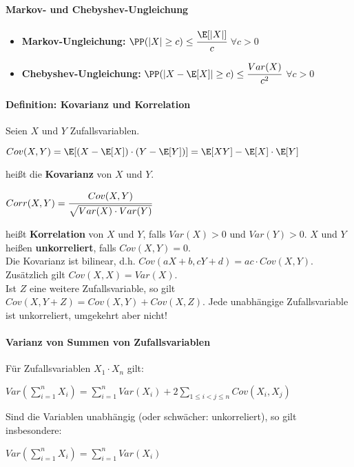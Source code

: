 \paragraph{Markov- und Chebyshev-Ungleichung}
\begin{itemize}
	\item \textbf{Markov-Ungleichung:} $\PP(|X|\geq c)\leq\cfrac{\E[|X|]}{c}$ \qquad$\forall c>0$
	\item \textbf{Chebyshev-Ungleichung:} $\PP(|X-\E[X]|\geq c)\leq\cfrac{Var(X)}{c^2}$ \qquad$\forall c>0$
\end{itemize}

\paragraph{Definition: Kovarianz und Korrelation}
Seien $X$ und $Y$ Zufallsvariablen.
\begin{tightcenter}
	$Cov(X,Y)=\E[(X-\E[X])\cdot(Y-\E[Y])]=\E[XY]-\E[X]\cdot\E[Y]$
\end{tightcenter}
heißt die \textbf{Kovarianz} von $X$ und $Y$.
\begin{tightcenter}
	$Corr(X,Y)=\cfrac{Cov(X,Y)}{\sqrt{Var(X)\cdot Var(Y)}}$
\end{tightcenter}
heißt \textbf{Korrelation} von $X$ und $Y$, falls $Var(X)>0$ und $Var(Y)>0$.
$X$ und $Y$ heißen \textbf{unkorreliert}, falls $Cov(X,Y)=0$.\\
Die Kovarianz ist bilinear, d.h. $Cov(aX+b,cY+d)=ac\cdot Cov(X,Y)$.\\
Zusätzlich gilt $Cov(X,X)=Var(X)$.\\
Ist $Z$ eine weitere Zufallsvariable, so gilt $Cov(X,Y+Z)=Cov(X,Y)+Cov(X,Z)$.
Jede unabhängige Zufallsvariable ist unkorreliert, umgekehrt aber nicht!

\paragraph{Varianz von Summen von Zufallsvariablen}
Für Zufallsvariablen $X_1\cdot X_n$ gilt:
\begin{tightcenter}
	$Var(\sum\limits_{i=1}^{n}X_i)=\sum\limits_{i=1}^{n}Var(X_i)+2\sum\limits_{1\leq i<j\leq n}Cov(X_i,X_j)$
\end{tightcenter}
Sind die Variablen unabhängig (oder schwächer: unkorreliert), so gilt insbesondere:
\begin{tightcenter} 
	$Var(\sum\limits_{i=1}^{n}X_i)=\sum\limits_{i=1}^{n}Var(X_i)$
\end{tightcenter}

